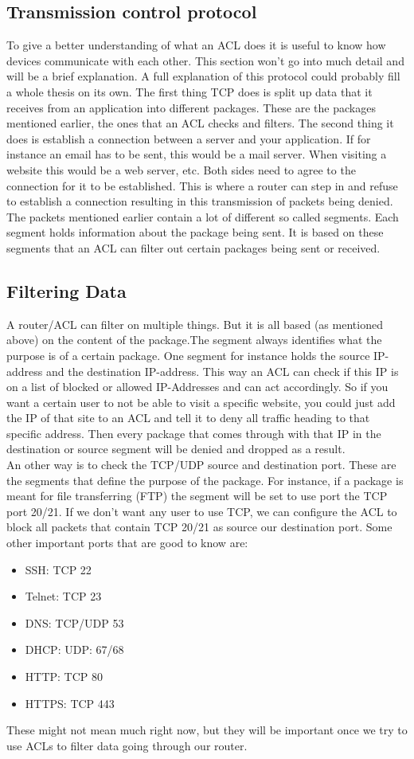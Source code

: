 \subsection{Transmission control protocol}
To give a better understanding of what an ACL does it is useful to know how devices communicate with each other. This section won't go into much detail and will be a brief explanation. A full explanation of this protocol could probably fill a whole thesis on its own.
The first thing TCP does is split up data that it receives from an application into different packages. These are the packages mentioned earlier, the ones that an ACL checks and filters.
The second thing it does is establish a connection between a server and your application. If for instance an email has to be sent, this would be a mail server. When visiting a website this would be a web server, etc. Both sides need to agree to the connection for it to be established. This is where a router can step in and refuse to establish a connection resulting in this transmission of packets being denied.
The packets mentioned earlier contain a lot of different so called segments. Each segment holds information about the package being sent. It is based on these segments that an ACL can filter out certain packages being sent or received.
\subsection{Filtering Data}
A router/ACL can filter on multiple things. But it is all based (as mentioned above) on the content of the package.The segment always identifies what the purpose is of a certain package. One segment for instance holds the source IP-address and the destination IP-address. This way an ACL can check if this IP is on a list of blocked or allowed IP-Addresses and can act accordingly. So if you want a certain user to not be able to visit a specific website, you could just add the IP of that site to an ACL and tell it to deny all traffic heading to that specific address. Then every package that comes through with that IP in the destination or source segment will be denied and dropped as a result.\\
An other way is to check the TCP/UDP source and destination port. These are the segments that define the purpose of the package. For instance, if a package is meant for file transferring (FTP) the segment will be set to use port the TCP port 20/21. If we don't want any user to use TCP, we can configure the ACL to block all packets that contain TCP 20/21 as source our destination port. Some other important ports that are good to know are:
\begin{itemize}
\item SSH: TCP 22
\item Telnet: TCP 23
\item DNS: TCP/UDP 53
\item DHCP: UDP: 67/68
\item HTTP: TCP 80
\item HTTPS: TCP 443
\end{itemize}
 These might not mean much right now, but they will be important once we try to use ACLs to filter data going through our router.

